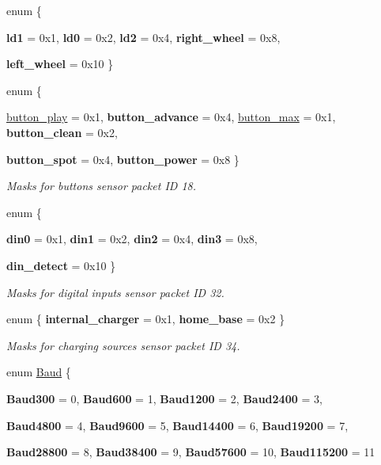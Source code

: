 \begin{DoxyCompactItemize}
enum \{ \par
{\bfseries ld1} =  0x1, 
{\bfseries ld0} =  0x2, 
{\bfseries ld2} =  0x4, 
{\bfseries right\_\-wheel} =  0x8, 
\par
{\bfseries left\_\-wheel} =  0x10
 \}
\item 
enum \{ \par
\hyperlink{namespaceroomba_masks_a757c0df4e6ad61c0034379e107d9f8c2ad4fee41dff4be8b4eb68eaa4c557e398}{button\_\-play} =  0x1, 
{\bfseries button\_\-advance} =  0x4, 
\hyperlink{namespaceroomba_masks_a757c0df4e6ad61c0034379e107d9f8c2adf6fecc4e30bdcad6fa8808fb0df9f18}{button\_\-max} =  0x1, 
{\bfseries button\_\-clean} =  0x2, 
\par
{\bfseries button\_\-spot} =  0x4, 
{\bfseries button\_\-power} =  0x8
 \}
\begin{DoxyCompactList}\small\item\em Masks for buttons sensor packet ID 18. \item\end{DoxyCompactList}\item 
enum \{ \par
{\bfseries din0} =  0x1, 
{\bfseries din1} =  0x2, 
{\bfseries din2} =  0x4, 
{\bfseries din3} =  0x8, 
\par
{\bfseries din\_\-detect} =  0x10
 \}
\begin{DoxyCompactList}\small\item\em Masks for digital inputs sensor packet ID 32. \item\end{DoxyCompactList}\item 
enum \{ {\bfseries internal\_\-charger} =  0x1, 
{\bfseries home\_\-base} =  0x2
 \}
\begin{DoxyCompactList}\small\item\em Masks for charging sources sensor packet ID 34. \item\end{DoxyCompactList}\item 
enum \hyperlink{namespaceroomba_masks_a807fb9ebae76dcdf09f8b13e4a8c8929}{Baud} \{ \par
{\bfseries Baud300} =  0, 
{\bfseries Baud600} =  1, 
{\bfseries Baud1200} =  2, 
{\bfseries Baud2400} =  3, 
\par
{\bfseries Baud4800} =  4, 
{\bfseries Baud9600} =  5, 
{\bfseries Baud14400} =  6, 
{\bfseries Baud19200} =  7, 
\par
{\bfseries Baud28800} =  8, 
{\bfseries Baud38400} =  9, 
{\bfseries Baud57600} =  10, 
{\bfseries Baud115200} =  11

\end{DoxyCompactItemize}
